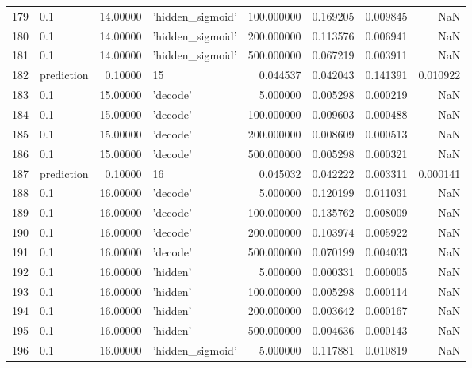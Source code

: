 \documentclass[10pt,a4paper]{article}
\begin{document}
\begin{tabular}{llrlrrrr}
179  &         0.1 &  14.00000 &   'hidden\_sigmoid' &  100.000000 &  0.169205 &  0.009845 &       NaN \\
180  &         0.1 &  14.00000 &   'hidden\_sigmoid' &  200.000000 &  0.113576 &  0.006941 &       NaN \\
181  &         0.1 &  14.00000 &   'hidden\_sigmoid' &  500.000000 &  0.067219 &  0.003911 &       NaN \\
182  &  prediction &   0.10000 &                 15 &    0.044537 &  0.042043 &  0.141391 &  0.010922 \\
183  &         0.1 &  15.00000 &           'decode' &    5.000000 &  0.005298 &  0.000219 &       NaN \\
184  &         0.1 &  15.00000 &           'decode' &  100.000000 &  0.009603 &  0.000488 &       NaN \\
185  &         0.1 &  15.00000 &           'decode' &  200.000000 &  0.008609 &  0.000513 &       NaN \\
186  &         0.1 &  15.00000 &           'decode' &  500.000000 &  0.005298 &  0.000321 &       NaN \\
187  &  prediction &   0.10000 &                 16 &    0.045032 &  0.042222 &  0.003311 &  0.000141 \\
188  &         0.1 &  16.00000 &           'decode' &    5.000000 &  0.120199 &  0.011031 &       NaN \\
189  &         0.1 &  16.00000 &           'decode' &  100.000000 &  0.135762 &  0.008009 &       NaN \\
190  &         0.1 &  16.00000 &           'decode' &  200.000000 &  0.103974 &  0.005922 &       NaN \\
191  &         0.1 &  16.00000 &           'decode' &  500.000000 &  0.070199 &  0.004033 &       NaN \\
192  &         0.1 &  16.00000 &           'hidden' &    5.000000 &  0.000331 &  0.000005 &       NaN \\
193  &         0.1 &  16.00000 &           'hidden' &  100.000000 &  0.005298 &  0.000114 &       NaN \\
194  &         0.1 &  16.00000 &           'hidden' &  200.000000 &  0.003642 &  0.000167 &       NaN \\
195  &         0.1 &  16.00000 &           'hidden' &  500.000000 &  0.004636 &  0.000143 &       NaN \\
196  &         0.1 &  16.00000 &   'hidden\_sigmoid' &    5.000000 &  0.117881 &  0.010819 &       NaN \\

\end{tabular}
\end{document}
